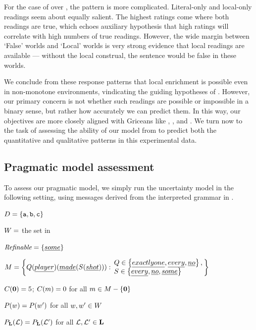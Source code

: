 \documentclass[leqno]{article}
\begin{document}
For the case of  over , the pattern is
more complicated. Literal-only and local-only readings seem about
equally salient. The highest ratings come where both readings are
true, which echoes  auxiliary
hypothesis that high ratings will correlate with high numbers of true
readings. However, the wide margin between `False' worlds and `Local'
worlds is very strong evidence that local readings are available ---
without the local construal, the sentence would be false in these
worlds. 

We conclude from these response patterns that local enrichment is
possible even in non-monotone environments, vindicating the guiding
hypotheses of \citet{Chemla:Spector:2011}. However, our primary
concern is not whether such readings are possible or impossible in a
binary sense, but rather how accurately we can predict them. In this
way, our objectives are more closely aligned with Griceans like
\citet{Geurts09}, \citet{Geurts:Pouscoulous:2009}, and
\citet{geurts-vantiel:2013:scalar}. We turn now to the task of
assessing the ability of our model from  to predict
both the quantitative and qualitative patterns in this experimental
data.


\subsection{Pragmatic model assessment}

To assess our pragmatic model, we simply run the uncertainty
model in the following setting, using messages derived from the
interpreted grammar in .

\begin{examples}
\item\label{expmod}
  \begin{examples}
  \item $D = \left\{ \texttt{a}, \texttt{b}, \texttt{c} \right\}$
  \item $W = $ the set in 
  \item $\textit{Refinable} = \left\{ \emph{some} \right\}$
  \item $\Messages =
    \setlength{\arraycolsep}{2pt}
    \set{
      Q(\word{player})(\word{made}(S(\word{shot}))) :
      \begin{array}{l}        
        Q \in \set{\word{exactly one}, \word{every}, \word{no}}, \\
        S \in \set{\word{every}, \word{no}, \word{some}}
      \end{array}}$
  \item $C(\mathbf{0}) = 5$; $C(m) = 0$ for all $m \in M-\left\{ \mathbf{0} \right\}$  
  \item $P(w) = P(w')$ for all $w, w' \in W$
  \item $P_{\mathbf{L}}(\mathcal{L}) = P_{\mathbf{L}}(\mathcal{L}')$ for all $\mathcal{L}, \mathcal{L}' \in \mathbf{L}$
  \end{examples}
\end{examples}
\end{document}
